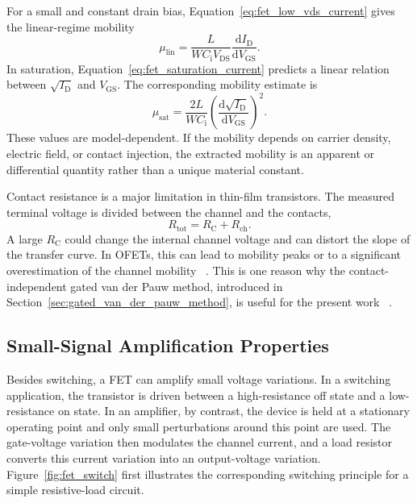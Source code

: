 For a small and constant drain bias, Equation~\ref{eq:fet_low_vds_current} gives
the linear-regime mobility
\begin{equation}
    \mu_\mathrm{lin}
    = \frac{L}{W C_\mathrm{i}V_\mathrm{DS}}
    \frac{\mathrm{d}I_\mathrm{D}}{\mathrm{d}V_\mathrm{GS}}.
    \label{eq:fet_linear_mobility}
\end{equation}
In saturation, Equation~\ref{eq:fet_saturation_current} predicts a linear
relation between $\sqrt{I_\mathrm{D}}$ and $V_\mathrm{GS}$. The corresponding
mobility estimate is
\begin{equation}
    \mu_\mathrm{sat}
    = \frac{2L}{W C_\mathrm{i}}
    \left(
        \frac{\mathrm{d}\sqrt{I_\mathrm{D}}}
        {\mathrm{d}V_\mathrm{GS}}
    \right)^2.
    \label{eq:fet_saturation_mobility}
\end{equation}
These values are model-dependent. If the mobility depends on carrier density,
electric field, or contact injection, the extracted mobility is an apparent or
differential quantity rather than a unique material constant.

Contact resistance is a major limitation in thin-film transistors. The measured
terminal voltage is divided between the channel and the contacts,
\begin{equation}
    R_\mathrm{tot}=R_\mathrm{C}+R_\mathrm{ch}.
    \label{eq:fet_total_resistance}
\end{equation}
A large $R_\mathrm{C}$ could change the internal channel voltage and
can distort the slope of the transfer curve. In OFETs, this can lead to mobility
peaks or to a significant overestimation of the channel mobility
~\cite{Bittle2016MobilityOverestimation,Natali2012ChargeInjection}. This is one
reason why the contact-independent gated van der Pauw method, introduced in
Section~\ref{sec:gated_van_der_pauw_method}, is useful for the present work
~\cite{Rolin2017GVDP}.

\subsection{Small-Signal Amplification Properties}

Besides switching, a FET can amplify small voltage variations. In a switching
application, the transistor is driven between a high-resistance off state and a
low-resistance on state. In an amplifier, by contrast, the device is held at a
stationary operating point and only small perturbations around this point are
used. The gate-voltage variation then modulates the channel current, and a load
resistor converts this current variation into an output-voltage variation.
Figure~\ref{fig:fet_switch} first illustrates the corresponding switching
principle for a simple resistive-load circuit.

